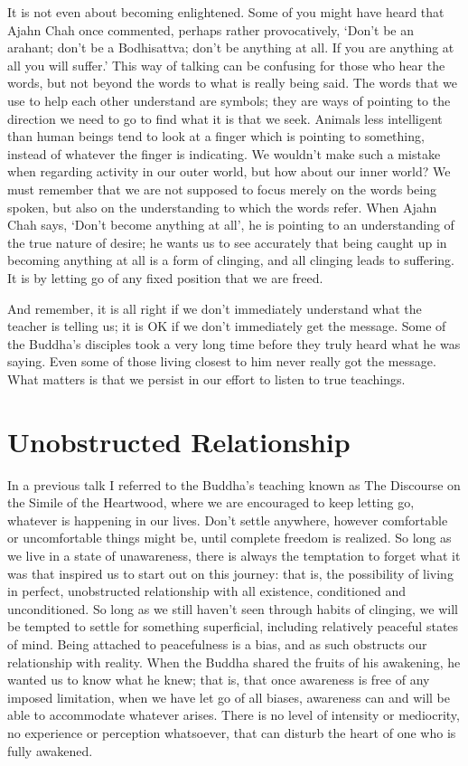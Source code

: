 It is not even about becoming enlightened. Some of you might have heard
that Ajahn Chah once commented, perhaps rather provocatively, ‘Don’t be
an arahant; don’t be a Bodhisattva; don’t be anything at all. If you are
anything at all you will suffer.’ This way of talking can be confusing
for those who hear the words, but not beyond the words to what is really
being said. The words that we use to help each other understand are
symbols; they are ways of pointing to the direction we need to go to
find what it is that we seek. Animals less intelligent than human beings
tend to look at a finger which is pointing to something, instead of
whatever the finger is indicating. We wouldn’t make such a mistake when
regarding activity in our outer world, but how about our inner world? We
must remember that we are not supposed to focus merely on the words
being spoken, but also on the understanding to which the words refer.
When Ajahn Chah says, ‘Don’t become anything at all’, he is pointing to
an understanding of the true nature of desire; he wants us to see
accurately that being caught up in becoming anything at all is a form of
clinging, and all clinging leads to suffering. It is by letting go of
any fixed position that we are freed.

And remember, it is all right if we don’t immediately understand what
the teacher is telling us; it is OK if we don’t immediately get the
message. Some of the Buddha’s disciples took a very long time before
they truly heard what he was saying. Even some of those living closest
to him never really got the message. What matters is that we persist in
our effort to listen to true teachings.

\section{Unobstructed Relationship}

In a previous talk I referred to the Buddha’s teaching known as The
Discourse on the Simile of the
Heartwood,\cite{mahasaropama-sutta} where we are encouraged to
keep letting go, whatever is happening in our lives. Don’t settle
anywhere, however comfortable or uncomfortable things might be, until
complete freedom is realized. So long as we live in a state of
unawareness, there is always the temptation to forget what it was that
inspired us to start out on this journey: that is, the possibility of
living in perfect, unobstructed relationship with all existence,
conditioned and unconditioned. So long as we still haven’t seen through
habits of clinging, we will be tempted to settle for something
superficial, including relatively peaceful states of mind. Being
attached to peacefulness is a bias, and as such obstructs our
relationship with reality. When the Buddha shared the fruits of his
awakening, he wanted us to know what he knew; that is, that once
awareness is free of any imposed limitation, when we have let go of all
biases, awareness can and will be able to accommodate whatever arises.
There is no level of intensity or mediocrity, no experience or
perception whatsoever, that can disturb the heart of one who is fully
awakened.

